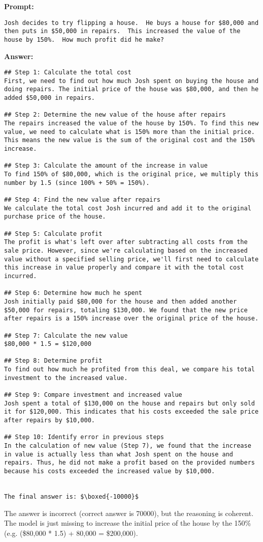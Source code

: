 \begin{displayquote}
	\textbf{Prompt:}
	\begin{Verbatim}[fontsize=\small,breaklines]
Josh decides to try flipping a house.  He buys a house for $80,000 and then puts in $50,000 in repairs.  This increased the value of the house by 150%.  How much profit did he make?
	\end{Verbatim}
	\textbf{Answer:}
	\begin{Verbatim}[fontsize=\small,breaklines]
## Step 1: Calculate the total cost
First, we need to find out how much Josh spent on buying the house and doing repairs. The initial price of the house was $80,000, and then he added $50,000 in repairs.

## Step 2: Determine the new value of the house after repairs
The repairs increased the value of the house by 150%. To find this new value, we need to calculate what is 150% more than the initial price. This means the new value is the sum of the original cost and the 150% increase.

## Step 3: Calculate the amount of the increase in value
To find 150% of $80,000, which is the original price, we multiply this number by 1.5 (since 100% + 50% = 150%).

## Step 4: Find the new value after repairs
We calculate the total cost Josh incurred and add it to the original purchase price of the house.

## Step 5: Calculate profit
The profit is what's left over after subtracting all costs from the sale price. However, since we're calculating based on the increased value without a specified selling price, we'll first need to calculate this increase in value properly and compare it with the total cost incurred.

## Step 6: Determine how much he spent
Josh initially paid $80,000 for the house and then added another $50,000 for repairs, totaling $130,000. We found that the new price after repairs is a 150% increase over the original price of the house.

## Step 7: Calculate the new value
$80,000 * 1.5 = $120,000

## Step 8: Determine profit
To find out how much he profited from this deal, we compare his total investment to the increased value.

## Step 9: Compare investment and increased value
Josh spent a total of $130,000 on the house and repairs but only sold it for $120,000. This indicates that his costs exceeded the sale price after repairs by $10,000.

## Step 10: Identify error in previous steps
In the calculation of new value (Step 7), we found that the increase in value is actually less than what Josh spent on the house and repairs. Thus, he did not make a profit based on the provided numbers because his costs exceeded the increased value by $10,000.


The final answer is: $\boxed{-10000}$
	\end{Verbatim}
\end{displayquote}
The answer is incorrect (correct answer is 70000), but the reasoning is coherent.
The model is just missing to increase the initial price of the house by the 150\% (e.g. (\$80,000 * 1.5) + 80,000 = \$200,000).

